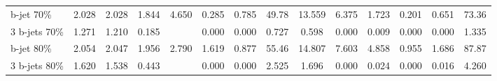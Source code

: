 \begin{table}
\begin{center}
{\begin{tabular}{l||cccc||cc|ccc|ccc||c }
            b-jet  70\%   &        2.028 &        2.028 &        1.844 &      4.650 &        0.285 &        0.785 &       49.78  &       13.559 &        6.375 &        1.723 &        0.201 &        0.651 &       73.36     \\        
            3 b-jets 70\% &        1.271 &        1.210 &        0.185 &            &        0.000 &        0.000 &        0.727 &        0.598 &        0.000 &        0.009 &        0.000 &        0.000 &        1.335    \\\hline  
                                                                                                                                                                                                                                     
            b-jet 80\%    &        2.054 &        2.047 &        1.956 &      2.790 &        1.619 &        0.877 &       55.46  &       14.807 &        7.603 &        4.858 &        0.955 &        1.686 &       87.87     \\        
            3 b-jets 80\% &        1.620 &        1.538 &        0.443 &            &        0.000 &        0.000 &        2.525 &        1.696 &        0.000 &        0.024 &        0.000 &        0.016 &        4.260    \\\hline  
                                                                                                                                                                                                                                     

\end{tabular}}
\end{center}
\end{table}
